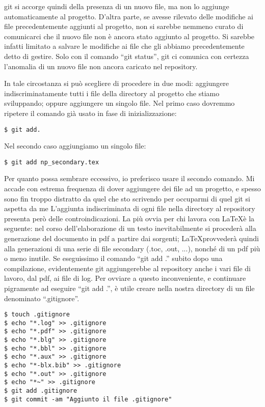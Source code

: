 \documentclass[a4paper,12pt,oneside]{article}
\begin{document}
git si accorge quindi della presenza di un nuovo file, ma non lo aggiunge
automaticamente al progetto. D'altra parte, se avesse rilevato delle modifiche
ai file precedentemente aggiunti al progetto, non si sarebbe nemmeno curato di
comunicarci che il nuovo file non è ancora stato aggiunto al progetto. Si
sarebbe infatti limitato a salvare le modifiche ai file che gli abbiamo
precedentemente detto di gestire. Solo con il comando ``git status'', git ci
comunica con certezza l'anomalia di un nuovo file non ancora caricato nel
repository.

In tale circostanza si può scegliere di procedere in due modi:
aggiungere indiscriminatamente tutti i file della directory al progetto che
stiamo sviluppando; oppure aggiungere un singolo file. Nel primo caso dovremmo
ripetere il comando già usato in fase di inizializzazione:

\begin{lstlisting}
$ git add.
\end{lstlisting}

Nel secondo caso aggiungiamo un singolo file:

\begin{lstlisting}
$ git add np_secondary.tex
\end{lstlisting}

Per quanto possa sembrare eccessivo, io preferisco usare il secondo comando.
Mi accade con estrema frequenza di
dover aggiungere dei file ad un progetto, e spesso sono fin troppo
distratto da quel che sto scrivendo per occuparmi di quel git si aspetta da me
L'aggiunta indiscriminata di ogni file nella directory al repository presenta
però delle controindicazioni.
La più ovvia per chi lavora con \LaTeX è la seguente:
nel corso dell'elaborazione di un testo inevitabilmente si
procederà alla generazione del documento in pdf a partire dai sorgenti;
\LaTeX provvederà quindi alla generazioni di una serie di file secondary (.toc,
.out, ...), nonché di un pdf più o meno inutile.
Se eseguissimo il comando ``git add .'' subito dopo una compilazione,
evidentemente git aggiungerebbe al repository anche i vari file di lavoro, dal
pdf, ai file  di log. Per ovviare a questo inconveniente, e continuare
pigramente ad eseguire ``git add .'', è utile creare nella nostra directory di
un file denominato ``.gitignore''.

\begin{lstlisting}
$ touch .gitignore
$ echo "*.log" >> .gitignore
$ echo "*.pdf" >> .gitignore
$ echo "*.blg" >> .gitignore
$ echo "*.bbl" >> .gitignore
$ echo "*.aux" >> .gitignore
$ echo "*-blx.bib" >> .gitignore
$ echo "*.out" >> .gitignore
$ echo "*~" >> .gitignore
$ git add .gitignore
$ git commit -am "Aggiunto il file .gitignore"
\end{lstlisting}
\end{document}

